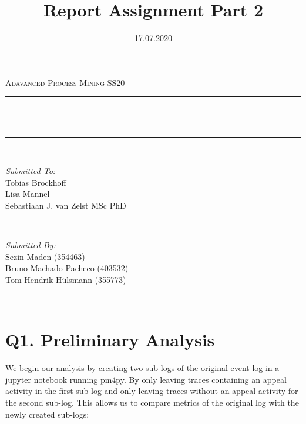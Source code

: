 \documentclass[12pt]{report}
\title{Report Assignment Part 2}
\author{}
\date{17.07.2020}
\makeatletter
\let\thetitle\@title
\makeatother
\begin{document}

\begin{titlepage}
	\centering
    \vspace*{0.5 cm}
  \begin{center}    \textsc{\Large   Adavanced Process Mining SS20}\\[2.0 cm]	\end{center}
	\rule{\linewidth}{0.2 mm} \\[0.4 cm]
	{ \huge \bfseries \thetitle}\\
	\rule{\linewidth}{0.2 mm} \\[1.5 cm]
	
  \begin{minipage}{0.48\textwidth}
    \begin{flushleft} \large
      \emph{Submitted To:}\\
      Tobias Brockhoff\\
      Lisa Mannel\\
      Sebastiaan J. van Zelst MSc PhD\\
    \end{flushleft}
  \end{minipage}~
  \begin{minipage}{0.48\textwidth}
    \begin{flushright} \large
			\emph{Submitted By:} \\
      Sezin Maden (354463) \\
      Bruno Machado Pacheco (403532)  \\
      Tom-Hendrik Hülsmann (355773)
		\end{flushright}
	\end{minipage}\\[2 cm]
	
\end{titlepage}


\renewcommand{\thesection}{\arabic{section}}

\section{Q1. Preliminary Analysis}
We begin our analysis by creating two sub-logs of the original event log in a jupyter notebook running pm4py.
By only leaving traces containing an appeal activity in the first sub-log and only leaving traces without an appeal activity for the second sub-log.
This allows us to compare metrics of the original log with the newly created sub-logs:
\end{document}

